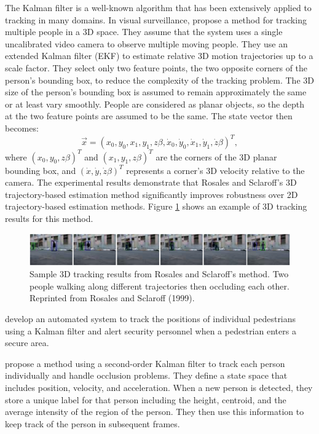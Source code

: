 The Kalman filter  is a well-known
algorithm that has been extensively applied to tracking in many
domains.  In visual surveillance, 
propose a method for tracking multiple people in a 3D space. They
assume that the system uses a single uncalibrated video camera to
observe multiple moving people. They use an extended Kalman filter
(EKF) to estimate relative 3D motion trajectories up to a scale
factor.  They select only two feature points, the two opposite corners
of the person's bounding box, to reduce the complexity of the tracking
problem. The 3D size of the person's bounding box is assumed to remain
approximately the same or at least vary smoothly. People are
considered as planar objects, so the depth at the two feature points
are assumed to be the same. The state vector then becomes:
\[
  \vec{x} = (x_0 ,y_0 ,x_1 ,y_1 ,z\beta ,\dot x_0 ,\dot y_0
  ,\dot x_1 ,\dot y_1 ,\dot z\beta )^T,
\]
where $(x_0, y_0, z\beta)^T$ and $(x_1, y_1, z\beta)^T$ are the
corners of the 3D planar bounding box, and $(\dot x, \dot y, \dot
z\beta)^T$ represents a corner's 3D velocity relative to the
camera. The experimental results demonstrate that Rosales and
Sclaroff's 3D trajectory-based estimation method significantly
improves robustness over 2D trajectory-based estimation methods.
Figure \ref{fig:rosales-tracking-result} shows an example of 3D
tracking results for this method.

\begin{figure}[t]
  \centering
  \includegraphics[width=6in]{figures/rosales-tracking-result.png}
  \caption[Sample 3D tracking results from Rosales and Sclaroff's
    method.]{\small Sample 3D tracking results from Rosales and
    Sclaroff's method. Two people walking along different trajectories
    then occluding each other. Reprinted from Rosales and Sclaroff
    (1999).}
  \label{fig:rosales-tracking-result}
\end{figure}

 develop an automated system to track the
positions of individual pedestrians using a Kalman filter and alert security
personnel when a pedestrian enters a secure area.

 propose a method using a second-order Kalman filter
to track each person individually and handle occlusion problems. They define a
state space that includes position, velocity, and acceleration. When a new
person is detected, they store a unique label for that person including the
height, centroid, and the average intensity of the region of the person. They
then use this information to keep track of the person in subsequent frames.

